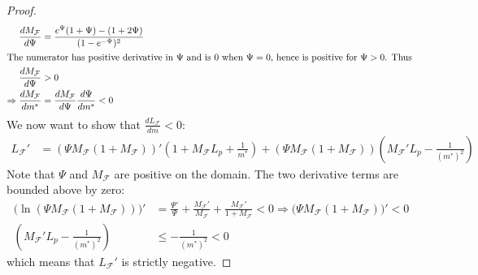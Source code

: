 \documentclass[10pt]{article}
\begin{document}
\begin{proof}
\begin{align*}
    \frac{dM_\mathcal{F}}{d\Psi} &= \frac{e^{\Psi}(1+\Psi) - (1+2\Psi)}{(1-e^{-\Psi})^2}\\
    \intertext{The numerator has positive derivative in $\Psi$ and is $0$ when $\Psi=0$, hence is positive for $\Psi>0$. Thus }
    \frac{dM_\mathcal{F}}{d\Psi} & > 0\\
    \Rightarrow \frac{dM_\mathcal{F}}{dm^*} &= \frac{dM_\mathcal{F}}{d\Psi}\frac{d\Psi}{dm^*} <0
\end{align*}
We now want to show that $\frac{dL_\mathcal{F}}{dm} < 0$:
\begin{align*}
    L_\mathcal{F}' &= (\Psi M_\mathcal{F}(1+M_\mathcal{F}))'(1 + M_\mathcal{F}L_p+\frac{1}{m^*}) + (\Psi M_\mathcal{F}(1+M_\mathcal{F}))(M_\mathcal{F}'L_p-\frac{1}{(m^*)^2})
\end{align*}
Note that $\Psi$ and $M_\mathcal{F}$ are positive on the domain. The two derivative terms are bounded above by zero:
\begin{align*}
    \Big(\ln(\Psi M_\mathcal{F}(1+M_\mathcal{F}))\Big)' &= \frac{\Psi'}{\Psi} + \frac{M_\mathcal{F}'}{M_\mathcal{F}} + \frac{M_\mathcal{F}'}{1+M_\mathcal{F}} <0 \Rightarrow \Big(\Psi M_\mathcal{F}(1+M_\mathcal{F})\Big)' <0\\
    (M_\mathcal{F}'L_p-\frac{1}{(m^*)^2}) &\leq -\frac{1}{(m^*)^2} <0
\end{align*}
which means that $L_\mathcal{F}'$ is strictly negative.
\end{proof}
\end{document}

